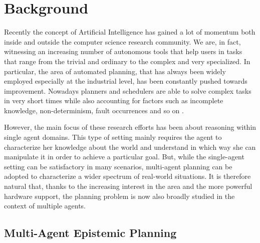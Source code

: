 \section{Background}
Recently the concept of Artificial Intelligence has gained a lot of momentum both inside and outside the computer science research community. %
We are, in fact, witnessing an increasing number of autonomous tools that help users in tasks that range from the trivial and ordinary to the complex and very specialized.
In particular, the area of automated planning, that has always been widely employed especially at the industrial level, has been constantly pushed towards improvement.
Nowadays planners and schedulers are able to solve complex tasks in very short times while also accounting for factors such as incomplete knowledge, non-determinism, fault occurrences and so on \cite{helmert2006fast,lipovetzky2017best,richter2010lama}.

However, the main focus of these research efforts has been about reasoning within single agent domains. 
This type of setting mainly requires the agent to characterize her knowledge about the world and understand in which way she can manipulate it in order to achieve a particular goal.
But, while the single-agent setting can be satisfactory in many scenarios, multi-agent planning can be adopted to characterize a wider spectrum of real-world situations.
It is therefore natural that, thanks to the increasing interest in the area and the more powerful hardware support, the planning problem is now also broadly studied in the context of multiple agents.



\subsection{Multi-Agent Epistemic Planning}


